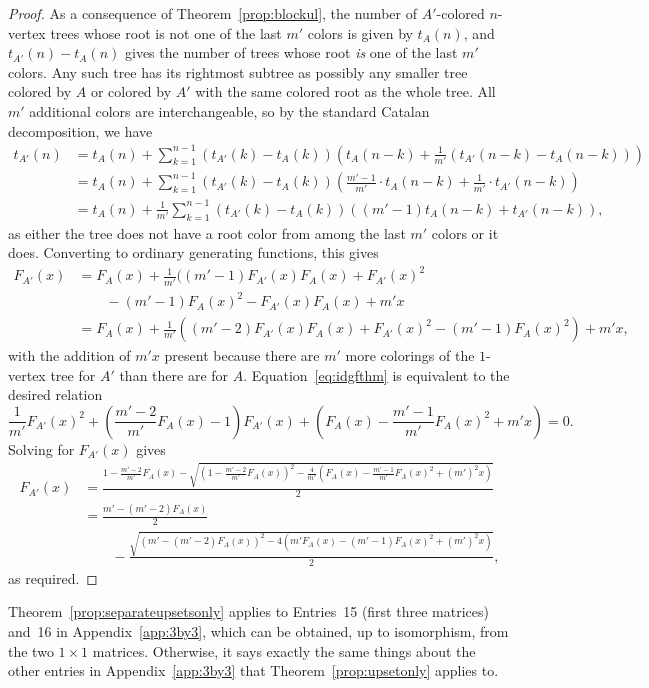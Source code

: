 \documentclass[12pt]{amsart}
\newcommand{\gfll}[1]{F_{#1}(x)}
\newcommand{\gfall}{\gfll{A}}
\begin{document}
\begin{proof}
    As a consequence of Theorem~\ref{prop:blockul}, the
    number of $A'$-colored $n$-vertex trees whose root is not one of the last $m'$ colors is given by $t_A(n)$, and $t_{A'}(n)-t_A(n)$ gives the number of trees whose root \emph{is} one of the last $m'$ colors. Any such tree has its rightmost subtree as possibly any smaller tree colored by $A$ or colored by $A'$ with the same colored root as the whole tree. All $m'$ additional colors are interchangeable, so by the standard Catalan decomposition, we have
    \begin{align*}
    t_{A'}(n)&=t_A(n)+\sum_{k=1}^{n-1}(t_{A'}(k)-t_A(k))\left(t_A(n-k)+\frac{1}{m'}(t_{A'}(n-k)-t_A(n-k))\right)\\
    &=t_A(n)+\sum_{k=1}^{n-1}(t_{A'}(k)-t_A(k))\left(\frac{m'-1}{m'}\cdot t_A(n-k)+\frac{1}{m'}\cdot t_{A'}(n-k)\right)\\
    &=t_A(n)+\frac{1}{m'}\sum_{k=1}^{n-1}(t_{A'}(k)-t_A(k))((m'-1)t_A(n-k)+t_{A'}(n-k)),
    \end{align*}
    as either the tree does not have a root color from among the last $m'$ colors or it does. Converting to ordinary generating functions, this gives
    \begin{align}
    \nonumber\gfll{A'}&=\gfall+\frac{1}{m'}((m'-1)\gfll{A'}\gfall+\gfll{A'}^2 \\
    &\nonumber\qquad -(m'-1)\gfall^2-\gfll{A'}\gfall+m'x\\
    &=\gfall+\frac{1}{m'}((m'-2)\gfll{A'}\gfall+\gfll{A'}^2-(m'-1)\gfall^2)+m'x\label{eq:idgfthm},
    \end{align}
    with the addition of $m'x$ present because there are $m'$ more colorings of the $1$-vertex tree for $A'$ than there are for $A$. 
    Equation~\eqref{eq:idgfthm} is equivalent to the desired relation
    \[
    \frac{1}{m'}\gfll{A'}^2+\left(\frac{m'-2}{m'}\gfall-1\right)\gfll{A'}+\left(\gfall-\frac{m'-1}{m'}\gfall^2+m'x\right)=0.
    \]
    Solving for $\gfll{A'}$ gives
    \begin{align*}
        \gfll{A'}&=\frac{1-\frac{m'-2}{m'}\gfall-\sqrt{\left(1-\frac{m'-2}{m'}\gfall\right)^2-\frac{4}{m'}\left(\gfall-\frac{m'-1}{m'}\gfall^2+(m')^2x\right)}}{2}\\
        &= \frac{m'-(m'-2)\gfall}{2} \\
    &\qquad - \frac{\sqrt{(m'-(m'-2)\gfall)^2-4(m'\gfall-(m'-1)\gfall^2+(m')^2x)}}{2},
    \end{align*}
    as required.
\end{proof}
Theorem~\ref{prop:separateupsetsonly} applies to Entries~15 (first three matrices) and~16 in Appendix~\ref{app:3by3}, which can be obtained, up to isomorphism, from the two $1\times 1$ matrices. Otherwise, it says exactly the same things about the other entries in Appendix~\ref{app:3by3} that Theorem~\ref{prop:upsetonly} applies to.
\end{document}
